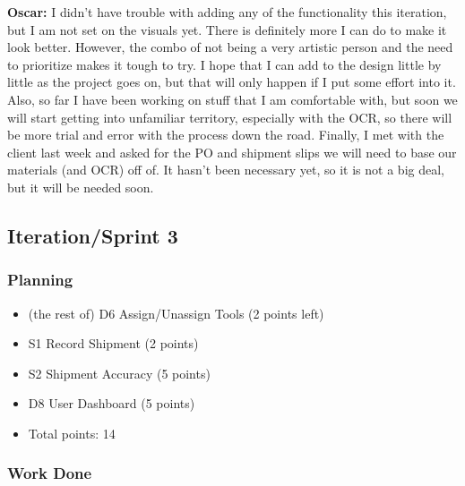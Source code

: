 \documentclass{article}
\begin{document}
\textbf{Oscar:} I didn't have trouble with adding any of the functionality this iteration, but I am not set on the visuals yet. There is definitely more I can do to make it look better. However, the combo of not being a very artistic person and the need to prioritize makes it tough to try. I hope that I can add to the design little by little as the project goes on, but that will only happen if I put some effort into it. 
Also, so far I have been working on stuff that I am comfortable with, but soon we will start getting into unfamiliar territory, especially with the OCR, so there will be more trial and error with the process down the road. 
Finally, I met with the client last week and asked for the PO and shipment slips we will need to base our materials (and OCR) off of. It hasn't been necessary yet, so it is not a big deal, but it will be needed soon. 



\subsection{Iteration/Sprint 3}
\subsubsection{Planning}

\begin{itemize}
    \item (the rest of) D6 Assign/Unassign Tools (2 points left)
    \item S1 Record Shipment (2 points)
    \item S2 Shipment Accuracy (5 points)
    \item D8 User Dashboard (5 points)
    \item Total points: 14
\end{itemize}

\subsubsection{Work Done}
\end{document}
